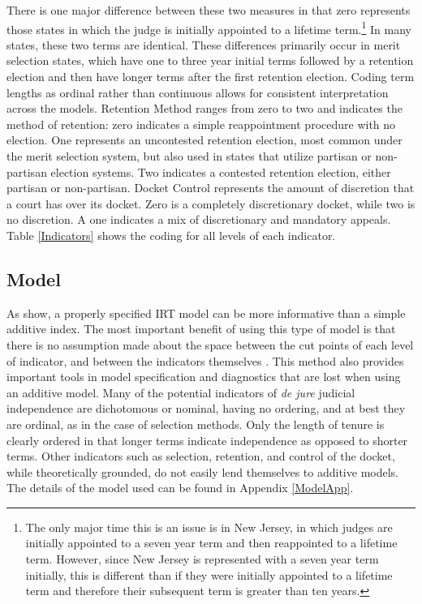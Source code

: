 \documentclass[12pt]{article}
\begin{document}
There is one major difference between these two measures in that zero represents those states in which the judge is initially appointed to a lifetime term.\footnote{The only major time this is an issue is in New Jersey, in which judges are initially appointed to a seven year term and then reappointed to a lifetime term.  However, since New Jersey is represented with a seven year term initially, this is different than if they were initially appointed to a lifetime term and therefore their subsequent term is greater than ten years.}  In many states, these two terms are identical.  These differences primarily occur in merit selection states, which have one to three year initial terms followed by a retention election and then have longer terms after the first retention election.  Coding term lengths as ordinal rather than continuous allows for consistent interpretation across the models.  Retention Method ranges from zero to two and indicates the method of retention: zero indicates a simple reappointment procedure with no election.  One represents an uncontested retention election, most common under the merit selection system, but also used in states that utilize partisan or non-partisan election systems.  Two indicates a contested retention election, either partisan or non-partisan.  Docket Control represents the amount of discretion that a court has over its docket.  Zero is a completely discretionary docket, while two is no discretion.  A one indicates a mix of discretionary and mandatory appeals. Table \ref{Indicators} shows the coding for all levels of each indicator. 

\subsection{Model}\label{Model}
As \citet{Linzer2014} show, a  properly specified IRT model can be more informative than a simple additive index.  The most important benefit of using this type of model is that there is no assumption made about the space between the cut points of each level of indicator, and between the indicators themselves \citep{Jackman2008,Schnakenberg2014}.  This method also provides important tools in model specification and diagnostics that are lost when using an additive model.  Many of the potential indicators of \textit{de jure} judicial independence are dichotomous or nominal, having no ordering, and at best they are ordinal, as in the case of selection methods.  Only the length of tenure is clearly ordered in that longer terms indicate independence as opposed to shorter terms.  Other indicators such as selection, retention, and control of the docket, while theoretically grounded, do not easily lend themselves to additive models.  The details of the model used can be found in Appendix \ref{ModelApp}. 
\end{document}
